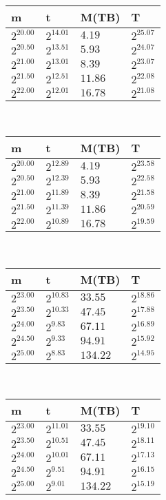  \ 
\begin{tabular}{llll}
m & t & M(TB) & T \\ \hline
$2^{20.00}$ & $2^{14.01}$ & $4.19$ & $2^{25.07}$ \\
$2^{20.50}$ & $2^{13.51}$ & $5.93$ & $2^{24.07}$ \\
$2^{21.00}$ & $2^{13.01}$ & $8.39$ & $2^{23.07}$ \\
$2^{21.50}$ & $2^{12.51}$ & $11.86$ & $2^{22.08}$ \\
$2^{22.00}$ & $2^{12.01}$ & $16.78$ & $2^{21.08}$ \\
\end{tabular}
 \ 
\begin{tabular}{llll}
m & t & M(TB) & T \\ \hline
$2^{20.00}$ & $2^{12.89}$ & $4.19$ & $2^{23.58}$ \\
$2^{20.50}$ & $2^{12.39}$ & $5.93$ & $2^{22.58}$ \\
$2^{21.00}$ & $2^{11.89}$ & $8.39$ & $2^{21.58}$ \\
$2^{21.50}$ & $2^{11.39}$ & $11.86$ & $2^{20.59}$ \\
$2^{22.00}$ & $2^{10.89}$ & $16.78$ & $2^{19.59}$ \\
\end{tabular}
 \ 
\begin{tabular}{llll}
m & t & M(TB) & T \\ \hline
$2^{23.00}$ & $2^{10.83}$ & $33.55$ & $2^{18.86}$ \\
$2^{23.50}$ & $2^{10.33}$ & $47.45$ & $2^{17.88}$ \\
$2^{24.00}$ & $2^{9.83}$ & $67.11$ & $2^{16.89}$ \\
$2^{24.50}$ & $2^{9.33}$ & $94.91$ & $2^{15.92}$ \\
$2^{25.00}$ & $2^{8.83}$ & $134.22$ & $2^{14.95}$ \\
\end{tabular}
 \ 
\begin{tabular}{llll}
m & t & M(TB) & T \\ \hline
$2^{23.00}$ & $2^{11.01}$ & $33.55$ & $2^{19.10}$ \\
$2^{23.50}$ & $2^{10.51}$ & $47.45$ & $2^{18.11}$ \\
$2^{24.00}$ & $2^{10.01}$ & $67.11$ & $2^{17.13}$ \\
$2^{24.50}$ & $2^{9.51}$ & $94.91$ & $2^{16.15}$ \\
$2^{25.00}$ & $2^{9.01}$ & $134.22$ & $2^{15.19}$ \\
\end{tabular}
